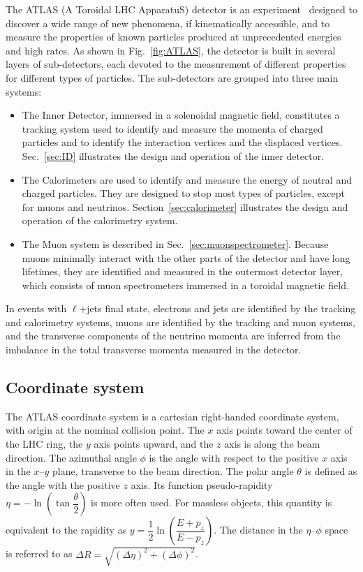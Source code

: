 The ATLAS (A Toroidal LHC ApparatuS) detector is an
experiment~\cite{detectorpaper} designed to discover a wide range of
new phenomena, if kinematically accessible, and to measure the
properties of known particles produced at unprecedented energies and
high rates.
As shown in Fig.~\ref{fig:ATLAS}, the detector is built in several
layers of sub-detectors, each devoted to the measurement of different
properties for different types of particles. The sub-detectors are
grouped into three main systems: 

\begin{itemize}
\item The Inner Detector, immersed in
  a solenoidal magnetic field, constitutes a tracking system used to
  identify and measure the momenta of charged particles and to
  identify the interaction vertices and the displaced
  vertices. Sec.~\ref{sec:ID} illustrates the design and operation of
  the inner detector.
\item The Calorimeters are used to identify and measure the energy of
  neutral and charged particles. They are designed to stop most types
  of particles, except for muons and
  neutrinos. Section~\ref{sec:calorimeter} illustrates the design and
  operation of the calorimetry system. 
\item The Muon system is described in
  Sec.~\ref{sec:muonspectrometer}. Because muons minimally interact
  with the other parts of the detector and have long lifetimes, they
  are identified and measured in the outermost detector layer, which
  consists of muon spectrometers immersed in a toroidal magnetic
  field. 
\end{itemize}

In \ttbar{} events with $\ell{}$+jets final state, electrons and jets
are identified by the tracking and calorimetry systems, muons are
identified by the tracking and muon systems, and the transverse
components of the neutrino momenta are inferred from the imbalance in
the total transverse momenta measured in the detector.

\subsection{Coordinate system}
\label{sec:coords}

The ATLAS coordinate system is a cartesian right-handed coordinate
system, with origin at the nominal collision point. The $x$ axis
points toward the center of the LHC ring, the $y$ axis points upward,
and the $z$ axis is along the beam direction. The azimuthal angle
$\phi$ is the angle with respect to the positive $x$ axis in the
$x$--$y$ plane, transverse to the beam direction. The polar angle
$\theta$ is defined as the angle with the positive $z$ axis. Its
function pseudo-rapidity \mbox{$\eta
  =-\ln\left(\tan\dfrac{\theta}{2}\right)$} is more often used. For
massless objects, this quantity is equivalent to the rapidity as
\mbox{$y =\dfrac{1}{2}\ln\left(\dfrac{E+p_z}{E-p_z}\right)$}. The
distance in the $\eta$--$\phi$ space is referred to as \mbox{$\Delta R
  = \sqrt{(\Delta \eta)^2+(\Delta \phi)^2}$}.

